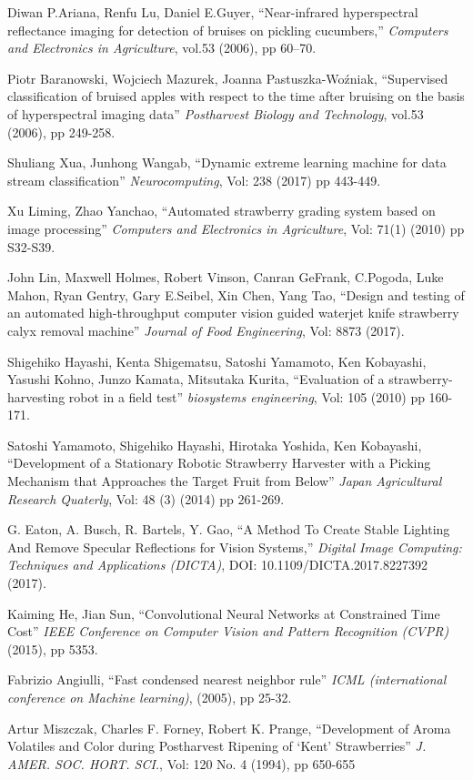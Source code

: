 \documentclass[conference]{IEEEtran}
\begin{document}
\begin{thebibliography}{1}
	Diwan P.Ariana, Renfu Lu, Daniel E.Guyer, ``Near-infrared hyperspectral reflectance imaging for detection of bruises on pickling cucumbers,'' {\em Computers and Electronics in Agriculture}, vol.53 (2006), pp 60–70.
	
	Piotr Baranowski, Wojciech Mazurek, Joanna Pastuszka-Woźniak, ``Supervised classification of bruised apples with respect to the time after bruising on the basis of hyperspectral imaging data'' {\em Postharvest Biology and Technology}, vol.53 (2006), pp 249-258.
	
	Shuliang Xua, Junhong Wangab, ``Dynamic extreme learning machine for data stream classification'' {\em Neurocomputing}, Vol: 238 (2017) pp 443-449.
	
	Xu Liming, Zhao Yanchao, ``Automated strawberry grading system based on image processing'' {\em Computers and Electronics in Agriculture}, Vol: 71(1) (2010) pp S32-S39.
	
	John Lin, Maxwell Holmes, Robert Vinson, Canran GeFrank, C.Pogoda, Luke Mahon, Ryan Gentry, Gary E.Seibel, Xin Chen, Yang Tao, ``Design and testing of an automated high-throughput computer vision guided waterjet knife strawberry calyx removal machine'' {\em Journal of Food Engineering}, Vol: 8873 (2017).
	
	Shigehiko Hayashi, Kenta Shigematsu, Satoshi Yamamoto, Ken Kobayashi, Yasushi Kohno, Junzo Kamata, Mitsutaka Kurita, ``Evaluation of a strawberry-harvesting robot in a field test'' {\em biosystems engineering}, Vol: 105 (2010) pp 160-171.
	
	Satoshi Yamamoto, Shigehiko Hayashi, Hirotaka Yoshida, Ken Kobayashi, ``Development of a Stationary Robotic Strawberry Harvester with a Picking Mechanism that Approaches the Target Fruit from Below'' {\em Japan Agricultural Research Quaterly}, Vol: 48 (3) (2014) pp 261-269.
	
	G. Eaton, A. Busch, R. Bartels, Y. Gao, ``A Method To Create Stable Lighting And Remove Specular Reflections for Vision Systems,'' {\em Digital Image Computing: Techniques and Applications (DICTA)}, DOI: 10.1109/DICTA.2017.8227392 (2017).
	
	Kaiming He, Jian Sun, ``Convolutional Neural Networks at Constrained Time Cost'' {\em IEEE Conference on Computer Vision and Pattern Recognition (CVPR)} (2015), pp 5353.
	
	Fabrizio Angiulli, ``Fast condensed nearest neighbor rule'' {\em ICML (international conference on Machine learning)}, (2005), pp 25-32.
	
	Artur Miszczak,  Charles F. Forney, Robert K. Prange, ``Development of Aroma Volatiles and Color during Postharvest Ripening of ‘Kent’ Strawberries'' {\em J. AMER. SOC. HORT. SCI.}, Vol: 120 No. 4 (1994), pp 650-655
	
\end{thebibliography}





\end{document}
